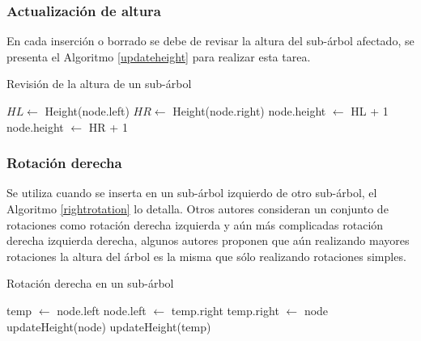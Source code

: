 \documentclass[paper=a4, fontsize=11pt]{scrartcl} %
\numberwithin{equation}{section} %
\numberwithin{figure}{section} %
\numberwithin{table}{section} %
\begin{document}
\subsubsection{Actualización de altura}
En cada inserción o borrado se debe de revisar la altura del sub-árbol afectado, se presenta el Algoritmo \ref{updateheight} para realizar esta tarea.
\begin{algorithm}
\caption{Revisión de la altura de un sub-árbol}\label{updateheight}
\begin{algorithmic}[1]
\State $HL \gets $ Height(node.left) 
\State $HR \gets $ Height(node.right) 
\State node.height $\gets$ HL + 1
\Else 
\State node.height $\gets$ HR + 1
\EndIf
\EndProcedure
\end{algorithmic}
\end{algorithm}

\subsubsection{Rotación derecha}
Se utiliza cuando se inserta en un sub-árbol izquierdo de otro sub-árbol, el Algoritmo \ref{rightrotation} lo detalla. Otros autores consideran un conjunto de rotaciones como rotación derecha izquierda y aún más complicadas rotación derecha izquierda derecha, algunos autores proponen que aún realizando mayores rotaciones la altura del árbol es la misma que sólo realizando rotaciones simples.  
\begin{algorithm}
\caption{Rotación derecha en un sub-árbol}\label{rightrotation}
\begin{algorithmic}[1]
\State temp $\gets $ node.left
\State node.left $\gets$ temp.right
\State temp.right $\gets$ node
\State updateHeight(node)
\State updateHeight(temp)
\EndProcedure
\end{algorithmic}
\end{algorithm}
\end{document}
